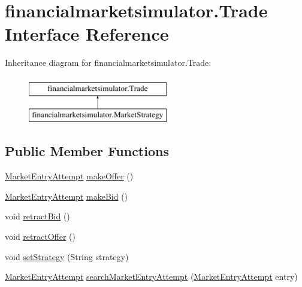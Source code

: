 \hypertarget{interfacefinancialmarketsimulator_1_1_trade}{\section{financialmarketsimulator.\+Trade Interface Reference}
\label{interfacefinancialmarketsimulator_1_1_trade}
}
Inheritance diagram for financialmarketsimulator.\+Trade\+:\begin{figure}[H]
\begin{center}
\leavevmode
\includegraphics[height=2.000000cm]{interfacefinancialmarketsimulator_1_1_trade}
\end{center}
\end{figure}
\subsection*{Public Member Functions}
\begin{DoxyCompactItemize}
\item 
\hyperlink{classfinancialmarketsimulator_1_1_market_entry_attempt}{Market\+Entry\+Attempt} \hyperlink{interfacefinancialmarketsimulator_1_1_trade_aba2e7742e3c7a477417abb741eb049af}{make\+Offer} ()
\item 
\hyperlink{classfinancialmarketsimulator_1_1_market_entry_attempt}{Market\+Entry\+Attempt} \hyperlink{interfacefinancialmarketsimulator_1_1_trade_ab84e578afb7f519b018ebc0ffaab4d2a}{make\+Bid} ()
\item 
void \hyperlink{interfacefinancialmarketsimulator_1_1_trade_a22d67d3c44faaf8fca8a4fd2d78a3e75}{retract\+Bid} ()
\item 
void \hyperlink{interfacefinancialmarketsimulator_1_1_trade_a1a1cbe142a99ac5e08872efea02239f7}{retract\+Offer} ()
\item 
void \hyperlink{interfacefinancialmarketsimulator_1_1_trade_aa3cfc0cff8e9a08e48cfd70ae870cb8b}{set\+Strategy} (String strategy)
\item 
\hyperlink{classfinancialmarketsimulator_1_1_market_entry_attempt}{Market\+Entry\+Attempt} \hyperlink{interfacefinancialmarketsimulator_1_1_trade_a2635502a77913bfa79d6a953ee7c3c1f}{search\+Market\+Entry\+Attempt} (\hyperlink{classfinancialmarketsimulator_1_1_market_entry_attempt}{Market\+Entry\+Attempt} entry)
\end{DoxyCompactItemize}


